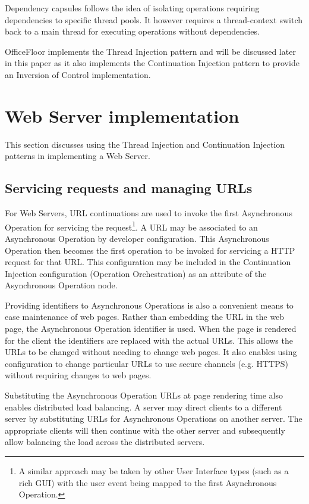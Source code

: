 \documentclass[prodmode]{style/acmlarge}
\begin{document}
Dependency capsules \cite{dependency-capsules} follows the idea of isolating
operations requiring dependencies to specific thread pools.  It however requires
a thread-context switch back to a main thread for executing operations without
dependencies.

OfficeFloor \cite{officefloor} implements the Thread Injection pattern and will
be discussed later in this paper as it also implements the Continuation
Injection pattern to provide an Inversion of Control implementation.




\section{Web Server implementation}

This section discusses using the Thread Injection and Continuation Injection
patterns in implementing a Web Server.


\subsection{Servicing requests and managing URLs}

For Web Servers, URL continuations \cite{url-continuation} are used to invoke
the first Asynchronous Operation for servicing the request\footnote{A similar
approach may be taken by other User Interface types (such as a rich GUI) with
the user event being mapped to the first Asynchronous Operation.}.  A URL may be
associated to an Asynchronous Operation by developer configuration.  This
Asynchronous Operation then becomes the first operation to be invoked for
servicing a HTTP request for that URL.  This configuration may be included in
the Continuation Injection configuration (Operation Orchestration) as an
attribute of the Asynchronous Operation node.

Providing identifiers to Asynchronous Operations is also a convenient means to
ease maintenance of web pages.  Rather than embedding the URL in the web page,
the Asynchronous Operation identifier is used.  When the page is rendered for
the client the identifiers are replaced with the actual URLs.  This allows the
URLs to be changed without needing to change web pages.  It also enables using
configuration to change particular URLs to use secure channels (e.g. HTTPS)
without requiring changes to web pages.

Substituting the Asynchronous Operation URLs at page rendering time also enables
distributed load balancing.  A server may direct clients to a different server
by substituting URLs for Asynchronous Operations on another server. The
appropriate clients will then continue with the other server and subsequently
allow balancing the load across the distributed servers.
\end{document}
